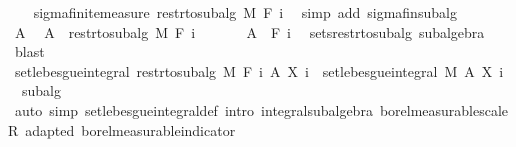 \begin{isabellebody}
\ \ \isamarkupfalse%
\ sigma{\isacharunderscore}{\kern0pt}finite{\isacharunderscore}{\kern0pt}measure\ {\isachardoublequoteopen}restr{\isacharunderscore}{\kern0pt}to{\isacharunderscore}{\kern0pt}subalg\ M\ {\isacharparenleft}{\kern0pt}F\ i{\isacharparenright}{\kern0pt}{\isachardoublequoteclose}\ \isamarkupfalse%
\ {\isacharparenleft}{\kern0pt}simp\ add{\isacharcolon}{\kern0pt}\ sigma{\isacharunderscore}{\kern0pt}fin{\isacharunderscore}{\kern0pt}subalg{\isacharparenright}{\kern0pt}\isanewline
\ \ \isacommand{{\isacharbraceleft}{\kern0pt}}\isamarkupfalse%
\isanewline
\ \ \ \ \isamarkupfalse%
\ A\ \isamarkupfalse%
\ {\isachardoublequoteopen}A\ {\isasymin}\ restr{\isacharunderscore}{\kern0pt}to{\isacharunderscore}{\kern0pt}subalg\ M\ {\isacharparenleft}{\kern0pt}F\ i{\isacharparenright}{\kern0pt}{\isachardoublequoteclose}\isanewline
\ \ \ \ \isamarkupfalse%
\ {\isacharasterisk}{\kern0pt}{\isacharcolon}{\kern0pt}\ {\isachardoublequoteopen}A\ {\isasymin}\ F\ i{\isachardoublequoteclose}\ \isamarkupfalse%
\ sets{\isacharunderscore}{\kern0pt}restr{\isacharunderscore}{\kern0pt}to{\isacharunderscore}{\kern0pt}subalg\ subalgebra\ \isamarkupfalse%
\ blast\isanewline
\ \ \ \ \isamarkupfalse%
\ {\isachardoublequoteopen}set{\isacharunderscore}{\kern0pt}lebesgue{\isacharunderscore}{\kern0pt}integral\ {\isacharparenleft}{\kern0pt}restr{\isacharunderscore}{\kern0pt}to{\isacharunderscore}{\kern0pt}subalg\ M\ {\isacharparenleft}{\kern0pt}F\ i{\isacharparenright}{\kern0pt}{\isacharparenright}{\kern0pt}\ A\ {\isacharparenleft}{\kern0pt}X\ i{\isacharparenright}{\kern0pt}\ {\isacharequal}{\kern0pt}\ set{\isacharunderscore}{\kern0pt}lebesgue{\isacharunderscore}{\kern0pt}integral\ M\ A\ {\isacharparenleft}{\kern0pt}X\ i{\isacharparenright}{\kern0pt}{\isachardoublequoteclose}\ \isamarkupfalse%
\ {\isacharasterisk}{\kern0pt}\ subalg\ \isamarkupfalse%
\ {\isacharparenleft}{\kern0pt}auto\ simp{\isacharcolon}{\kern0pt}\ set{\isacharunderscore}{\kern0pt}lebesgue{\isacharunderscore}{\kern0pt}integral{\isacharunderscore}{\kern0pt}def\ intro{\isacharcolon}{\kern0pt}\ integral{\isacharunderscore}{\kern0pt}subalgebra{}\ borel{\isacharunderscore}{\kern0pt}measurable{\isacharunderscore}{\kern0pt}scaleR\ adapted\ borel{\isacharunderscore}{\kern0pt}measurable{\isacharunderscore}{\kern0pt}indicator{\isacharparenright}{\kern0pt}\ \isanewline
\ \ \ \ \isamarkupfalse%
\ \isamarkupfalse%

\end{isabellebody}
